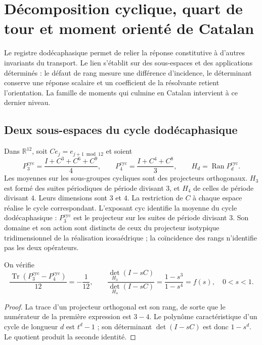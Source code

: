 \section{Décomposition cyclique, quart de tour et moment orienté de Catalan}
\label{iii:sec:catalan}

Le registre dodécaphasique permet de relier la réponse constitutive à
d’autres invariants du transport. Le lien s’établit sur des sous-espaces
et des applications déterminés : le défaut de rang mesure une différence
d’incidence, le déterminant conserve une réponse scalaire et un coefficient
de la résolvante retient l’orientation. La famille de moments qui culmine
en Catalan intervient à ce dernier niveau.

\subsection{Deux sous-espaces du cycle dodécaphasique}

Dans $\mathbb R^{12}$, soit $C e_j=e_{j+1\bmod12}$ et soient
\begin{equation}
 P_3^{\mathrm{cyc}}=\frac{I+C^3+C^6+C^9}{4},\qquad
 P_4^{\mathrm{cyc}}=\frac{I+C^4+C^8}{3},\qquad
 H_d=\operatorname{Ran}P_d^{\mathrm{cyc}}.
 \label{iii:eq:projectors34}
\end{equation}
Les moyennes sur les sous-groupes cycliques sont des projecteurs orthogonaux.
$H_3$ est formé des suites périodiques de période divisant $3$,
et $H_4$ de celles de période divisant $4$. Leurs dimensions sont $3$ et $4$.
La restriction de $C$ à chaque espace réalise le cycle correspondant.
L’exposant $\mathrm{cyc}$ identifie la moyenne du cycle dodécaphasique :
$P_3^{\mathrm{cyc}}$ est le projecteur sur les suites de période divisant
$3$. Son domaine et son action sont distincts de ceux du projecteur isotypique
tridimensionnel de la réalisation icosaédrique ; la coïncidence des rangs
n’identifie pas les deux opérateurs.

\begin{proposition}
On vérifie
\begin{equation}
 \frac{\operatorname{Tr}(P_3^{\mathrm{cyc}}-P_4^{\mathrm{cyc}})}{12}=-\frac1{12},\qquad
 \frac{\det_{H_3}(I-sC)}{\det_{H_4}(I-sC)}
 =\frac{1-s^3}{1-s^4}=f(s),\quad 0<s<1.
 \label{iii:eq:trace-det}
\end{equation}
\end{proposition}
\begin{proof}
La trace d’un projecteur orthogonal est son rang, de sorte que le numérateur
de la première expression est $3-4$. Le polynôme caractéristique d’un cycle
de longueur $d$ est $t^d-1$ ; son déterminant $\det(I-sC)$ est donc
$1-s^d$. Le quotient produit la seconde identité.
\end{proof}

